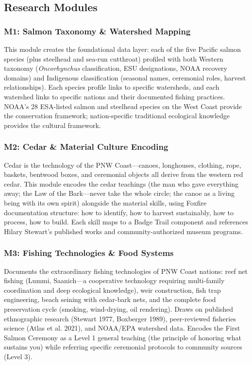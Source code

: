 \documentclass[11pt,letterpaper]{article}
\begin{document}
\subsection{Research Modules}

\subsubsection{M1: Salmon Taxonomy \& Watershed Mapping}
This module creates the foundational data layer: each of the five Pacific salmon species (plus steelhead and sea-run cutthroat) profiled with both Western taxonomy (\textit{Oncorhynchus} classification, ESU designations, NOAA recovery domains) and Indigenous classification (seasonal names, ceremonial roles, harvest relationships). Each species profile links to specific watersheds, and each watershed links to specific nations and their documented fishing practices. NOAA's 28 ESA-listed salmon and steelhead species on the West Coast provide the conservation framework; nation-specific traditional ecological knowledge provides the cultural framework.

\subsubsection{M2: Cedar \& Material Culture Encoding}
Cedar is the technology of the PNW Coast---canoes, longhouses, clothing, rope, baskets, bentwood boxes, and ceremonial objects all derive from the western red cedar. This module encodes the cedar teachings (the man who gave everything away; the Law of the Bark---never take the whole circle; the canoe as a living being with its own spirit) alongside the material skills, using Foxfire documentation structure: how to identify, how to harvest sustainably, how to process, how to build. Each skill maps to a Badge Trail component and references Hilary Stewart's published works and community-authorized museum programs.

\subsubsection{M3: Fishing Technologies \& Food Systems}
Documents the extraordinary fishing technologies of PNW Coast nations: reef net fishing (Lummi, Saanich---a cooperative technology requiring multi-family coordination and deep ecological knowledge), weir construction, fish trap engineering, beach seining with cedar-bark nets, and the complete food preservation cycle (smoking, wind-drying, oil rendering). Draws on published ethnographic research (Stewart 1977, Boxberger 1989), peer-reviewed fisheries science (Atlas et al. 2021), and NOAA/EPA watershed data. Encodes the First Salmon Ceremony as a Level 1 general teaching (the principle of honoring what sustains you) while referring specific ceremonial protocols to community sources (Level 3).
\end{document}
